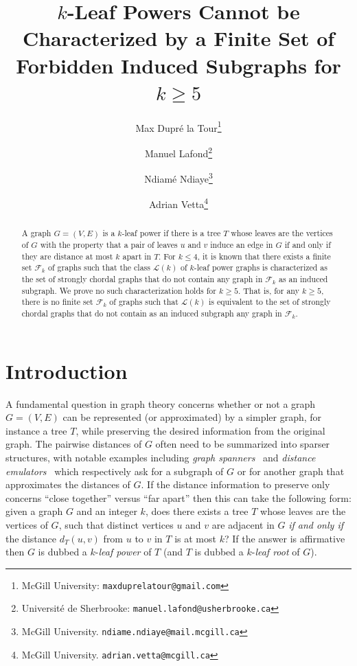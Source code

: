 \documentclass[11pt,letter]{article}
\title{$k$-Leaf Powers Cannot be Characterized by a Finite Set of Forbidden Induced Subgraphs for $k \geq 5$}
\date{ }
\author{
    Max Dupr\'e la Tour\thanks{McGill University: \texttt{maxduprelatour@gmail.com}} \and 
       Manuel Lafond\thanks{Universit\'e de Sherbrooke: \texttt{manuel.lafond@usherbrooke.ca}} \and 
  Ndiam\'e Ndiaye\thanks{McGill University. \texttt{ndiame.ndiaye@mail.mcgill.ca}} \and 
    Adrian Vetta\thanks{McGill University. \texttt{adrian.vetta@mcgill.ca}}
}
\theoremstyle{remark}
\newcommand{\F}{\mathscr{F}}
\renewcommand{\L}{\mathcal{L}}
\begin{document}
\maketitle

\begin{abstract}
A graph $G=(V,E)$ is a $k$-leaf power if there is a tree $T$ whose leaves are the vertices of $G$ with the property that 
a pair of leaves $u$ and $v$ induce an edge in $G$ if and only if they are distance at most $k$ apart in $T$.
For $k\le 4$, it is known that there exists a finite set $\F_k$ of graphs such that the class $\L(k)$ of $k$-leaf power graphs is characterized as the set of strongly chordal graphs that do not contain any graph in $\F_k$ as an induced subgraph. 
We prove no such characterization holds for $k\ge 5$.
That is, for any $k\ge 5$, there is no finite set $\F_k$ of graphs such that $\L(k)$ is equivalent to the set of strongly chordal graphs that do not contain as an induced subgraph any graph in $\F_k$.
\end{abstract}

\section{Introduction}\label{sec:intro}

A fundamental question in graph theory concerns whether or not a graph $G=(V,E)$ can be represented (or approximated) by a simpler graph, for instance a tree $T$, while preserving the desired information from the original graph.  
The pairwise distances of $G$ often need to be summarized into sparser structures, with 
notable examples including \emph{graph spanners}~\cite{cohen2020light,ahmed2020graph,filtser2021graph,le2022near} and \emph{distance emulators}~\cite{thorup2006spanners,chang2022almost,van2022fast} which respectively ask for a subgraph of $G$ or for another graph that approximates the distances of $G$.
If the distance information to preserve only concerns ``close together'' versus ``far apart'' then this can take the following form:
given a graph $G$ and an integer $k$, does there exists a tree $T$ whose leaves are the vertices of $G$, such that distinct vertices $u$ and $v$ are adjacent in $G$  {\em if and only if} the distance $d_T(u,v)$ from $u$ to $v$ in $T$ is at most $k$?  If the answer is affirmative then $G$ is dubbed a $k$-{\em leaf power} of $T$ (and $T$ is dubbed a $k$-{\em leaf root} of $G$). 
\end{document}

